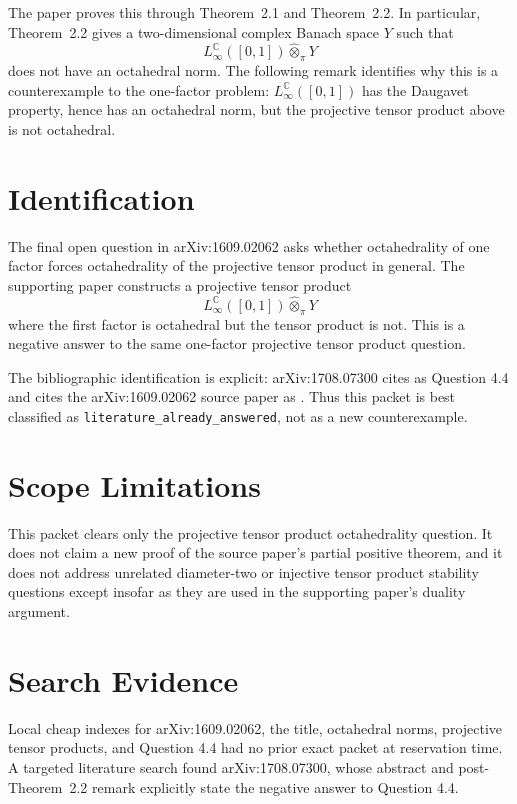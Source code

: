 \documentclass[11pt]{article}
\begin{document}
The paper proves this through Theorem~2.1 and Theorem~2.2.  In particular,
Theorem~2.2 gives a two-dimensional complex Banach space \(Y\) such that
\[
  L_\infty^\mathbb C([0,1]) \widehat\otimes_\pi Y
\]
does not have an octahedral norm.  The following remark identifies why this is
a counterexample to the one-factor problem: \(L_\infty^\mathbb C([0,1])\) has
the Daugavet property, hence has an octahedral norm, but the projective tensor
product above is not octahedral.

\section*{Identification}

The final open question in arXiv:1609.02062 asks whether octahedrality of one
factor forces octahedrality of the projective tensor product in general.  The
supporting paper constructs a projective tensor product
\[
  L_\infty^\mathbb C([0,1]) \widehat\otimes_\pi Y
\]
where the first factor is octahedral but the tensor product is not.  This is a
negative answer to the same one-factor projective tensor product question.

The bibliographic identification is explicit: arXiv:1708.07300 cites
\cite{LLR2017} as Question 4.4 and cites the arXiv:1609.02062 source paper as
\cite{LLR2017QJM}.  Thus this packet is best classified as
\texttt{literature\_already\_answered}, not as a new counterexample.

\section*{Scope Limitations}

This packet clears only the projective tensor product octahedrality question.
It does not claim a new proof of the source paper's partial positive theorem,
and it does not address unrelated diameter-two or injective tensor product
stability questions except insofar as they are used in the supporting paper's
duality argument.

\section*{Search Evidence}

Local cheap indexes for arXiv:1609.02062, the title, octahedral norms,
projective tensor products, and Question 4.4 had no prior exact packet at
reservation time.  A targeted literature search found arXiv:1708.07300, whose
abstract and post-Theorem~2.2 remark explicitly state the negative answer to
Question 4.4.
\end{document}
